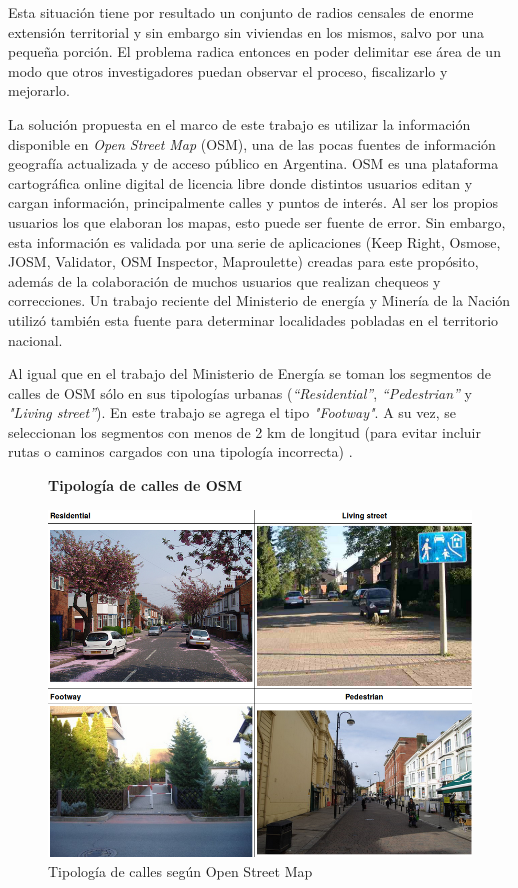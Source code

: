 Esta situación tiene por resultado un conjunto de radios censales de enorme extensión territorial y sin embargo sin viviendas en los mismos, salvo por una pequeña porción. El problema radica entonces en poder delimitar ese área de un modo que otros investigadores puedan observar el proceso, fiscalizarlo y mejorarlo.

La solución propuesta en el marco de este trabajo es utilizar la información disponible en \textit{Open Street Map } (OSM), una de las pocas fuentes de información geografía actualizada y de  acceso público en Argentina. OSM es una plataforma cartográfica online digital de licencia libre donde distintos usuarios editan y cargan información, principalmente calles y puntos de interés. Al ser los propios usuarios los que elaboran los mapas, esto puede ser fuente de error. Sin embargo, esta   información   es   validada   por   una   serie   de   aplicaciones (Keep Right, Osmose, JOSM, Validator, OSM Inspector, Maproulette) creadas  para  este propósito, además   de la colaboración de muchos usuarios que realizan chequeos y correcciones. Un trabajo reciente del Ministerio de energía y Minería de la Nación \cite{pino} utilizó también esta fuente para determinar localidades pobladas en el territorio nacional.

Al igual que en el trabajo del Ministerio de Energía se toman los segmentos de calles de OSM sólo en  sus  tipologías  urbanas  (\textit{“Residential”},  \textit{“Pedestrian”}  y \textit{"Living street”}). En este trabajo se agrega el tipo \textit{"Footway"}. A su vez, se seleccionan los segmentos con menos de 2 km de longitud (para evitar incluir rutas o caminos cargados con una  tipología  incorrecta) \cite{pino}.


\begin{figure}[!h]
	\centering
	\textbf{Tipología de calles de OSM}\par\medskip
	\includegraphics[scale = 0.4]{../img/capitulo2/osm.png}
	\caption{Tipología de calles según Open Street Map}
\end{figure}

